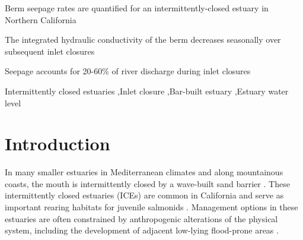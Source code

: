 \documentclass[preprint,12pt,authoryear]{elsarticle}
\begin{document}
\begin{frontmatter}
\begin{highlights}
\item Berm seepage rates are quantified for an  intermittently-closed estuary in Northern California
\item The integrated hydraulic conductivity of the berm decreases seasonally over subsequent inlet closures
\item Seepage accounts for 20-60\% of river discharge during inlet closures
\end{highlights}

\begin{keyword}
Intermittently closed estuaries \sep  Inlet closure \sep  Bar-built estuary \sep  Estuary water level
\end{keyword}

\end{frontmatter}


%  

\section{Introduction}
\label{sec:intro}

In many smaller estuaries in Mediterranean climates and along mountainous coasts, the mouth is intermittently closed by a wave-built sand barrier \citep{mcsweeney2017intermittently, largier2023recognizing}. 
These intermittently closed estuaries (ICEs) are common in California 
\citep{heady2015assessing} and serve as important rearing habitats for juvenile salmonids \citep{bond2008marine, heady2015assessing, huber2020environmental}. Management options in these estuaries are often constrained by anthropogenic alterations of the physical system, including the development of adjacent low-lying flood-prone areas \citep{largier2019considerations}.
\end{document}

